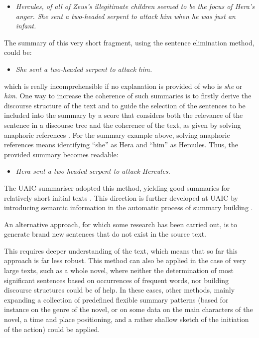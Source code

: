\begin{multicols}{2}
\begin{itemize}
\item\textit{Hercules, of all of Zeus’s illegitimate children seemed to be the focus of Hera’s anger. She sent a two-headed serpent to attack him when he was just an infant.}
\end{itemize}

The summary of this very short fragment, using the sentence elimination method, could be:

\begin{itemize}
\item \textit{She sent a two-headed serpent to attack him.}
\end{itemize}

\noindent
which is really incomprehensible if no explanation is provided of who is \textit{she} or \textit{him}.
One way to increase the coherence of such summaries is to firstly derive the discourse structure of the text and to guide the selection of the sentences to be included into the summary by a score that considers both the relevance of the sentence in a discourse tree and the coherence of the text, as given by solving anaphoric references \cite{cristea1}. For the summary example above, solving anaphoric references means identifying “she” as Hera and “him” as Hercules. Thus, the provided summary becomes readable:

\begin{itemize}
\item \textit{Hera sent a two-headed serpent to attack Hercules.}
\end{itemize}

The UAIC summariser adopted this method, yielding good summaries for relatively short initial texts \cite{cristea2}. This direction is further developed at UAIC by introducing semantic information in the automatic process of summary building \cite{trandabatRez}.

An alternative approach, for which some research has been carried out, is to generate brand new sentences that do not exist in the source text.

This requires deeper understanding of the text, which means that so far this approach is far less robust. This method can also be applied in the case of very large texts, such as a whole novel, where neither the determination of most significant sentences based on occurrences of frequent words, nor building discourse structures could be of help. In these cases, other methods, mainly expanding a collection of predefined flexible summary patterns (based for instance on the genre of the novel, or on some data on the main characters of the novel, a time and place positioning, and a rather shallow sketch of the initiation of the action) could be applied. 


\end{multicols}
